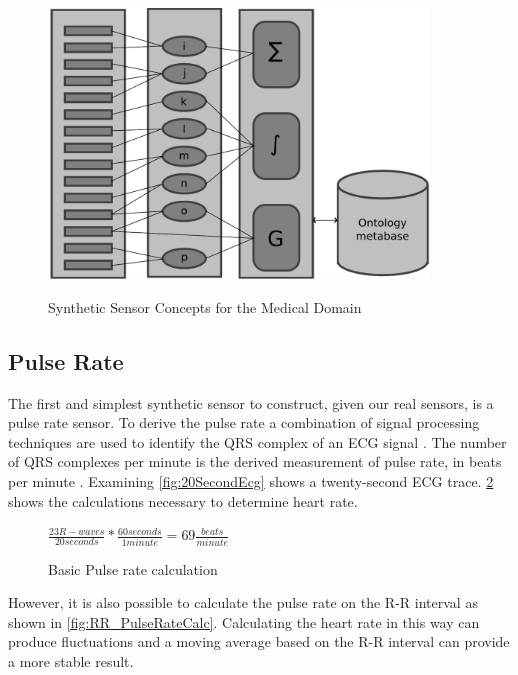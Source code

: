 \begin{figure}
	\begin{center}
		\label{fig:SyntheticSensor}
		\includegraphics[scale=1,width=0.9\textwidth]{Images/syntheticSensor.pdf} 
		\caption{Synthetic Sensor Concepts for the Medical Domain}
	\end{center}
\end{figure}

\subsection{Pulse Rate}
\label{subsec:PulseRate}
The first and simplest synthetic sensor to construct, given our real sensors, is a pulse rate sensor. To derive the pulse rate a combination of signal processing techniques are used to identify the QRS complex of an ECG signal \cite{Chaitanya2011}. The number of QRS complexes per minute is the derived measurement of pulse rate, in beats per minute \cite{Scully2012}. Examining \cref{fig:20SecondEcg} shows a twenty-second ECG trace. \cref{fig:PulseRateCalc} shows the calculations necessary to determine heart rate.
\begin{figure}
	\begin{center}
		\label{fig:PulseRateCalc}
		$\frac{23 R-waves}{20 seconds}*\frac{60 seconds}{1 minute}=69 \frac{beats}{minute}$
		\caption{Basic Pulse rate calculation}
	\end{center}
\end{figure}

However, it is also possible to calculate the pulse rate on the R-R interval as shown in \cref{fig:RR_PulseRateCalc}. Calculating the heart rate in this way can produce fluctuations and a moving average based on the R-R interval can provide a more stable result.

